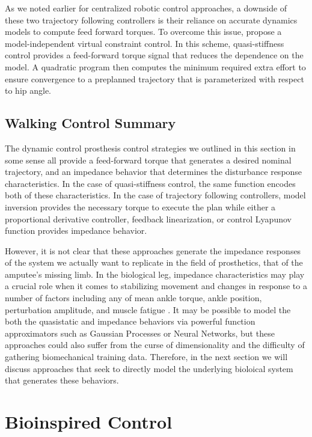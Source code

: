 As we noted earlier for centralized robotic control approaches, a downside of
these two trajectory following controllers is their reliance on accurate
dynamics models to compute feed forward torques. To overcome this issue,
\citet{zhao2016first} propose a model-independent virtual constraint control. In
this scheme, quasi-stiffness control provides a feed-forward torque signal that
reduces the dependence on the model. A quadratic program then computes the
minimum required extra effort to ensure convergence to a preplanned trajectory
that is parameterized with respect to hip angle.

\subsection{Walking Control Summary}

The dynamic control prosthesis control strategies we outlined in this section in
some sense all provide a feed-forward torque that generates a desired nominal
trajectory, and an impedance behavior that determines the disturbance response
characteristics. In the case of quasi-stiffness control, the same function
encodes both of these characteristics.  In the case of trajectory following
controllers, model inversion provides the necessary torque to execute the plan
while either a proportional derivative controller, feedback linearization, or
control Lyapunov function provides impedance behavior.  

However, it is not clear that these approaches generate the impedance responses
of the system we actually want to replicate in the field of prosthetics, that of
the amputee's missing limb. In the biological leg, impedance characteristics may
play a crucial role when it comes to stabilizing movement
\citep{won1995stability, burdet2001central} and changes in response to a number
of factors including any of mean ankle torque, ankle position, perturbation
amplitude, and muscle fatigue \citep{kearney1989system}. It may be possible to
model the both the quasistatic and impedance behaviors via powerful function
approximators such as Gaussian Processes or Neural Networks, but these
approaches could also suffer from the curse of dimensionality and the difficulty
of gathering biomechanical training data. Therefore, in the next section we will
discuss approaches that seek to directly model the underlying bioloical system
that generates these behaviors.

\section{Bioinspired Control}\label{sec:back_bioinspired_pros_control} 

